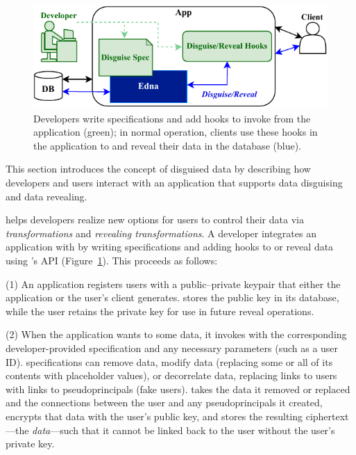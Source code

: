 \begin{figure}[t]
  \centering
    \includegraphics[width=.7\textwidth]{figs/edna_overview}
    \caption[Developers write disguise specifications and add hooks to invoke
    Edna's API.]{Developers write \xx specifications and add hooks to invoke
    \sys from the application (green); in normal operation, clients use these
    hooks in the application to \xx and reveal their data in the database
    (blue).}
  \label{f:edna-overview}
\end{figure}
%

This section introduces the concept of disguised data by describing how
developers and users interact with an application that supports data disguising
and data revealing.
%

%
\sys helps developers realize new options for users to control their data
via \emph{\xxing transformations} and \emph{revealing transformations}.
%
A developer integrates an application with \sys by writing \xx specifications
and adding hooks to \xx or reveal data using \sys's API
(Figure~\ref{f:edna-overview}). This proceeds as follows:

%
(1) An application registers users with a public--private keypair
that either the application or the user's client generates. \sys stores the
public key in its database, while the user retains the private key for use in
future reveal operations.
%

%
(2) When the application wants to \xx some data, it invokes \sys with the
corresponding developer-provided \xx specification and any necessary
parameters (such as a user ID).
%
\Xx specifications can remove data, modify data (replacing some or all of its
contents with placeholder values), or decorrelate data, replacing
links to users with links to pseudoprincipals (fake users).
%
%
\sys takes the data it removed or replaced and the connections between the user
and any pseudoprincipals it created, encrypts that data with the user's public
key, and stores the resulting ciphertext---the \emph{\xxed data}---such that it
cannot be linked back to the user without the user's
private key.
%

